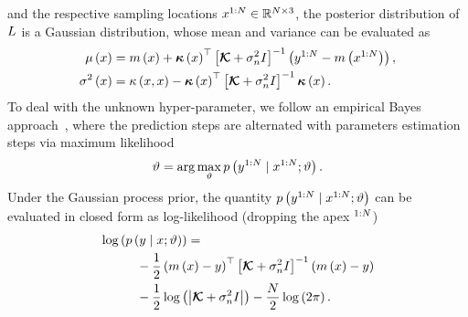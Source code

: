 and the respective sampling locations $x^{1:N} \in \mathbb{R}^{N \times 3}$, the posterior distribution of $L$ is a Gaussian distribution,
whose mean and variance can be evaluated as
\begin{align}%
	\label{EQ:SEARCH-POST-MEAN}
	\pmu \lp \xx \rp & = \prior \lp \xx \rp + \kv \lp \xx \rp\T \lps \km + \nn I \rps^{-1}
						 \lp \yy^{1:\nsample} - \prior \lp \xx^{1:\nsample} \rp \rp, \\
	\label{EQ:SEARCH-POST-VARIANCE}
	\pvar \lp \xx \rp & = \kf \lp \xx,\xx \rp - \kv \lp \xx \rp\T \lps \km + \nn I \rps^{-1} \kv \lp \xx \rp.
\end{align}
To deal with the unknown hyper-parameter, we follow an empirical Bayes approach~\cite{benevento2020multi}, where the prediction steps are
alternated with parameters estimation steps via maximum likelihood
\begin{equation*}
	\vartheta = \arg\max_{\vartheta}  p \left( y^{1:N} \mid x^{1:N}; \vartheta \right).
\end{equation*}
Under the Gaussian process prior, the quantity $p \left( y^{1:N} \mid x^{1:N}; \vartheta \right)$ can be evaluated in closed
form as log-likelihood (dropping the apex $^{1:N}$)
\begin{equation*}
	\begin{split}
		& \log \left( p \left( y \mid x; \vartheta \right) \right) = \\
		& \hspace{1cm} -\frac{1}{2} \left( m \left( x \right) - y \right) ^{\top} \left[ \boldsymbol{\mathcal{K}} + \sigma_n^2 I \right]^{-1} \left( m \left( x \right) - y \right)\\
		& \hspace{1cm} -\frac{1}{2} \log \left( \left| \boldsymbol{\mathcal{K}} + \sigma_n^2 I \right| \right) - \frac{N}{2}\log \left( 2\pi \right).
	\end{split}
\end{equation*}


